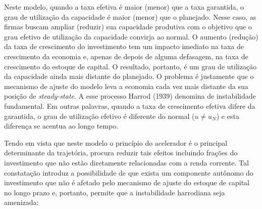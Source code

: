 Neste modelo, quando a taxa efetiva é maior (menor) que a taxa garantida, o grau de utilização da capacidade é maior (menor) que o planejado. Nesse caso, as firmas buscam ampliar (reduzir) sua capacidade produtiva com o objetivo que o grau efetivo de utilização da capacidade convirja ao normal. O aumento (redução) da taxa de crescimento do investimento tem um impacto imediato na taxa de crescimento da
economia e, apenas de depois de alguma defasagem, na taxa de crescimento do estoque de capital. O resultado, portanto, é um grau de utilização da capacidade ainda mais distante do planejado. O problema é justamente que o mecanismo de ajuste do modelo leva a economia cada vez mais distante da sua posição de \textit{steady-state}. A esse processo Harrod (1939) denomina de instabilidade fundamental. Em outras palavras, quando a taxa de crescimento efetiva difere  da garantida, o grau de utilização efetivo é diferente do normal ($u\neq u_N$) e esta diferença se acentua ao longo tempo.






Tendo em vista que neste modelo o princípio do acelerador é o principal determinante da trajetória, \textcite[p.~26--28]{harrod_essay_1939} procura reduzir tais efeitos incluindo frações do investimento que não estão diretamente relacionadas com a renda corrente. Tal constatação introduz a possibilidade de que exista um componente autônomo do investimento que não é afetado pelo mecanismo de ajuste do estoque de capital no longo prazo e, portanto, permite que a instabilidade harrodiana seja amenizada:

